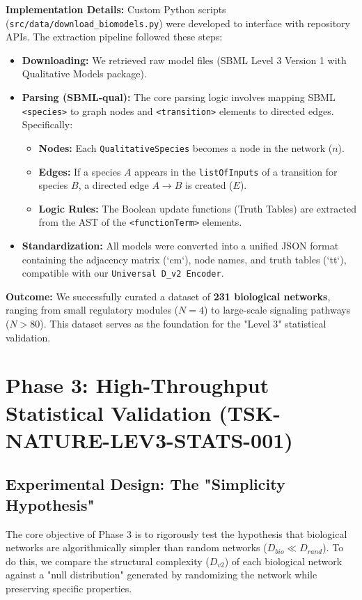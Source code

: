 \documentclass{article}
\begin{document}
\textbf{Implementation Details:}
Custom Python scripts (\texttt{src/data/download\_biomodels.py}) were developed to interface with repository APIs. The extraction pipeline followed these steps:
\begin{itemize}
    \item \textbf{Downloading:} We retrieved raw model files (SBML Level 3 Version 1 with Qualitative Models package).
    \item \textbf{Parsing (SBML-qual):} The core parsing logic involves mapping SBML \texttt{<species>} to graph nodes and \texttt{<transition>} elements to directed edges. Specifically:
    \begin{itemize}
        \item \textbf{Nodes:} Each \texttt{QualitativeSpecies} becomes a node in the network ($n$).
        \item \textbf{Edges:} If a species $A$ appears in the \texttt{listOfInputs} of a transition for species $B$, a directed edge $A \to B$ is created ($E$).
        \item \textbf{Logic Rules:} The Boolean update functions (Truth Tables) are extracted from the AST of the \texttt{<functionTerm>} elements.
    \end{itemize}
    \item \textbf{Standardization:} All models were converted into a unified JSON format containing the adjacency matrix (`cm`), node names, and truth tables (`tt`), compatible with our \texttt{Universal D\_v2 Encoder}.
\end{itemize}

\textbf{Outcome:}
We successfully curated a dataset of \textbf{231 biological networks}, ranging from small regulatory modules ($N=4$) to large-scale signaling pathways ($N > 80$). This dataset serves as the foundation for the "Level 3" statistical validation.

\section{Phase 3: High-Throughput Statistical Validation (TSK-NATURE-LEV3-STATS-001)}
\subsection{Experimental Design: The "Simplicity Hypothesis"}
The core objective of Phase 3 is to rigorously test the hypothesis that biological networks are algorithmically simpler than random networks ($D_{bio} \ll D_{rand}$). To do this, we compare the structural complexity ($D_{v2}$) of each biological network against a "null distribution" generated by randomizing the network while preserving specific properties.
\end{document}
